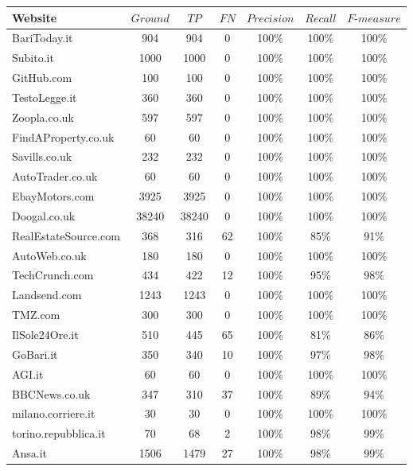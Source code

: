 \begin{table}%
 \centering
 \begin{tabular}{|l|c|c|c|c|c|c|}
  \hline
  \hline
  \textbf{Website} & $Ground$ & $TP$ & $FN$ & $Precision$ & $Recall$ & $F\text{-}measure$ \\
  \hline
  BariToday.it & 904 & 904 & 0 &100\% & 100\% & 100\% \\
  \hline
  Subito.it & 1000 & 1000 & 0 & 100\% & 100\% & 100\% \\
  \hline
  GitHub.com & 100 & 100 & 0 & 100\% & 100\% & 100\% \\
  \hline
  TestoLegge.it & 360 & 360 & 0 & 100\% & 100\% & 100\% \\
  \hline
  Zoopla.co.uk & 597 & 597 & 0 & 100\% & 100\% & 100\% \\
  \hline
  FindAProperty.co.uk & 60 & 60 & 0 & 100\% & 100\% & 100\% \\
  \hline
  Savills.co.uk & 232 & 232 & 0 & 100\% & 100\% & 100\% \\
  \hline
  AutoTrader.co.uk & 60 & 60 & 0 & 100\% & 100\% & 100\% \\
  \hline
  EbayMotors.com & 3925 & 3925 & 0 & 100\% & 100\% & 100\% \\
  \hline
  Doogal.co.uk & 38240 & 38240 & 0 & 100\% & 100\% & 100\% \\
  \hline
  RealEstateSource.com & 368 & 316 & 62 & 100\% & 85\% & 91\% \\
  \hline
  AutoWeb.co.uk & 180 & 180 & 0 & 100\% & 100\% & 100\% \\
  \hline
  TechCrunch.com & 434 & 422 & 12 & 100\% & 95\% & 98\% \\
  \hline
  Landsend.com & 1243 & 1243 & 0 & 100\% & 100\% & 100\% \\
  \hline
  TMZ.com & 300 & 300 & 0 & 100\% & 100\% & 100\% \\
  \hline
  IlSole24Ore.it & 510 & 445 & 65 & 100\% & 81\% & 86\% \\
  \hline
  GoBari.it & 350 & 340 & 10 & 100\% & 97\% & 98\% \\
  \hline
  AGI.it & 60 & 60 & 0 & 100\% & 100\% & 100\% \\
  \hline
  BBCNews.co.uk & 347 & 310 & 37 & 100\% & 89\% & 94\% \\
  \hline
  milano.corriere.it & 30 & 30 & 0 & 100\% & 100\% & 100\% \\
  \hline
  torino.repubblica.it & 70 & 68 & 2 & 100\% & 98\% & 99\% \\
  \hline
  Ansa.it & 1506 & 1479 & 27 & 100\% & 98\% & 99\% \\

\end{tabular}
\end{table}
